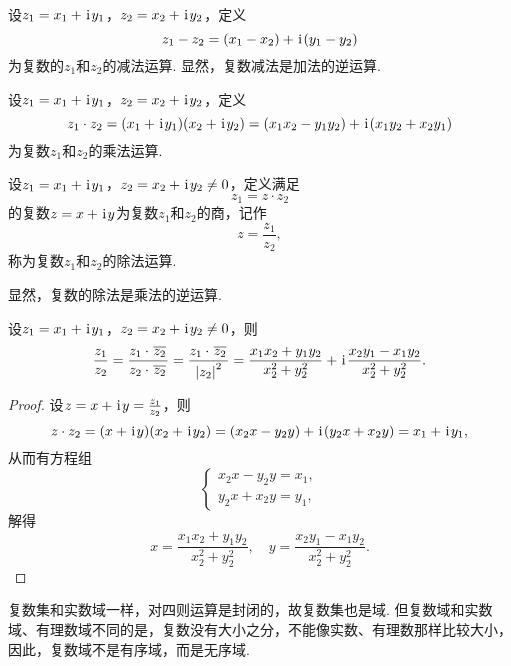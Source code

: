 \begin{definition}[复数减法]
设\(z_1=x_1+\kern1pt\mathrm{i}\kern1pt y_1\)，\(z_2=x_2+\kern1pt\mathrm{i}\kern1pt y_2\)，定义\[
z_1-z_2=(x_1-x_2)+\kern1pt\mathrm{i}\kern1pt(y_1-y_2)
\]为复数的\(z_1\)和\(z_2\)的减法运算.
显然，复数减法是加法的逆运算.
\end{definition}

\begin{definition}[复数乘法]
设\(z_1 = x_1 + \kern1pt\mathrm{i}\kern1pt y_1\)，\(z_2 = x_2 + \kern1pt\mathrm{i}\kern1pt y_2\)，定义\[
z_1 \cdot z_2
= (x_1 + \kern1pt\mathrm{i}\kern1pt y_1)(x_2 + \kern1pt\mathrm{i}\kern1pt y_2)
= (x_1 x_2 - y_1 y_2)+\kern1pt\mathrm{i}\kern1pt(x_1 y_2 + x_2 y_1)
\]为复数\(z_1\)和\(z_2\)的乘法运算.
\end{definition}

\begin{definition}[复数除法]
设\(z_1 = x_1 + \kern1pt\mathrm{i}\kern1pt y_1\)，\(z_2 = x_2 + \kern1pt\mathrm{i}\kern1pt y_2 \neq 0\)，定义满足\[
z_1 = z \cdot z_2
\]的复数\(z = x + \kern1pt\mathrm{i}\kern1pt y\)为复数\(z_1\)和\(z_2\)的商，记作\[
z = \frac{z_1}{z_2},
\]称为复数\(z_1\)和\(z_2\)的除法运算.

显然，复数的除法是乘法的逆运算.
\end{definition}

\begin{theorem}
设\(z_1 = x_1 + \kern1pt\mathrm{i}\kern1pt y_1\)，\(z_2 = x_2 + \kern1pt\mathrm{i}\kern1pt y_2 \neq 0\)，则\[
\frac{z_1}{z_2}
= \frac{z_1 \cdot \kern1pt\overline{z_2}\kern1pt}{z_2 \cdot \kern1pt\overline{z_2}\kern1pt}
= \frac{z_1 \cdot \kern1pt\overline{z_2}\kern1pt}{\abs{z_2}^2}
= \frac{x_1 x_2 + y_1 y_2}{x_2^2 + y_2^2}
+ \kern1pt\mathrm{i}\kern1pt \frac{x_2 y_1 - x_1 y_2}{x_2^2 + y_2^2}.
\]
\begin{proof}
设\(z = x + \kern1pt\mathrm{i}\kern1pt y = \frac{z_1}{z_2}\)，则\[
z \cdot z_2 = (x + \kern1pt\mathrm{i}\kern1pt y)(x_2 + \kern1pt\mathrm{i}\kern1pt y_2)
= (x_2 x - y_2 y) + \kern1pt\mathrm{i}\kern1pt(y_2 x + x_2 y)
= x_1 + \kern1pt\mathrm{i}\kern1pt y_1,
\]从而有方程组\[
\left\{ \begin{array}{l}
x_2 x - y_2 y = x_1, \\
y_2 x + x_2 y = y_1,
\end{array} \right.
\]解得\[
x = \frac{x_1 x_2 + y_1 y_2}{x_2^2 + y_2^2},
\quad
y = \frac{x_2 y_1 - x_1 y_2}{x_2^2 + y_2^2}.
\]
\end{proof}
\end{theorem}

\begin{property}
复数集和实数域一样，对四则运算是封闭的，故复数集也是域.
但复数域和实数域、有理数域不同的是，复数没有大小之分，不能像实数、有理数那样比较大小，因此，复数域不是有序域，而是无序域.
\end{property}

